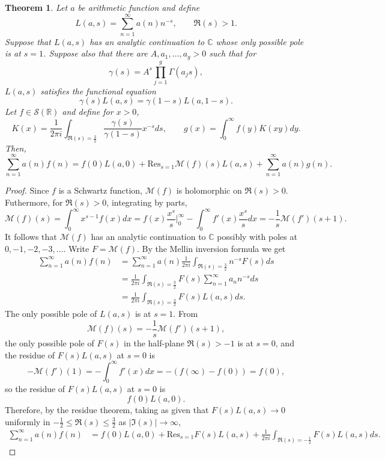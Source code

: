 \documentclass{article}
\newcommand{\Res}{\mathrm{Res}}
\newtheorem{theorem}{Theorem}
\begin{document}
\begin{theorem}
Let $a$ be arithmetic function and define
\[
L(a,s) = \sum_{n=1}^\infty a(n) n^{-s}, \qquad \Re(s)>1.
\]
Suppose that $L(a,s)$ has an analytic continuation to $\mathbb{C}$ whose only possible pole
is at $s=1$. 
Suppose also that there are $A,a_1,\ldots,a_g>0$ such that
for
\[
\gamma(s) = A^s \prod_{j=1}^g \Gamma(a_j s),
\]
$L(a,s)$
satisfies the functional equation
\[
\gamma(s)L(a,s) = \gamma(1-s)L(a,1-s).
\]
Let  $f \in \mathscr{S}(\mathbb{R})$ and define for $x>0$,
\[
K(x) = \frac{1}{2\pi i} \int_{\Re(s)=\frac{3}{2}} \frac{\gamma(s)}{\gamma(1-s)} x^{-s} ds,
\qquad g(x) = \int_0^\infty f(y) K(xy) dy.
\]
Then,
\[
\sum_{n=1}^\infty a(n) f(n) = f(0)L(a,0) + \Res_{s=1} \mathscr{M}(f)(s) L(a,s)
+  \sum_{n=1}^\infty a(n) g(n).
\]
\label{generalized}
\end{theorem}
\begin{proof}
Since $f$ is a Schwartz function, $\mathscr{M}(f)$ is holomorphic on $\Re(s)>0$. 
Futhermore, for $\Re(s)>0$, integrating by parts,
\[
\mathscr{M}(f)(s)=\int_0^\infty x^{s-1} f(x) dx
=f(x) \frac{x^s}{s} \bigg|_0^\infty - 
\int_0^\infty f'(x) \frac{x^s}{s} dx
=-\frac{1}{s}\mathscr{M}(f')(s+1).
\]
It follows that $\mathscr{M}(f)$ has an analytic continuation to $\mathbb{C}$ possibly with poles
at $0,-1,-2,-3,\ldots$.
Write $F=\mathscr{M}(f)$. By the Mellin inversion formula we get
\begin{align*}
\sum_{n=1}^\infty a(n) f(n)&=\sum_{n=1}^\infty a(n) 
\frac{1}{2\pi i}\int_{\Re(s)=\frac{3}{2}} n^{-s} F(s) ds\\
&=\frac{1}{2\pi i} \int_{\Re(s)=\frac{3}{2}} F(s) \sum_{n=1}^\infty a_n n^{-s} ds\\
&=\frac{1}{2\pi i} \int_{\Re(s)=\frac{3}{2}}F(s) L(a,s) ds.
\end{align*}
The only possible pole of $L(a,s)$ is at $s=1$. From 
\[
\mathscr{M}(f)(s)=-\frac{1}{s}\mathscr{M}(f')(s+1),
\]
the only possible pole of $F(s)$ in the half-plane $\Re(s)>-1$ is at $s=0$,
and the residue of $F(s)L(a,s)$ at $s=0$ is
\[
-\mathscr{M}(f')(1)=-\int_0^\infty f'(x) dx = -(f(\infty)-f(0)) = f(0),
\]
so the residue of $F(s)L(a,s)$ at $s=0$ is
\[
f(0)L(a,0).
\]
Therefore, by the residue theorem, taking as given  that $F(s)L(a,s) \to 0$ uniformly in $-\frac{1}{2} \leq \Re(s) \leq \frac{3}{2}$ as $|\Im(s)| \to \infty$,
\begin{align*}
\sum_{n=1}^\infty a(n) f(n)&=f(0)L(a,0)+\Res_{s=1} F(s)L(a,s)
+ \frac{1}{2\pi i} \int_{\Re(s)=-\frac{1}{2}} F(s)L(a,s) ds.
\end{align*}



\end{proof}
\end{document}
